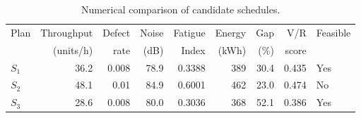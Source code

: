 \begin{table}[htbp]
\centering
\caption{Numerical comparison of candidate schedules.}
\label{tab:numerical-sim}
\small
\begin{tabular}{@{}lrrrrrrrl@{}}
\toprule
Plan & Throughput & Defect & Noise & Fatigue & Energy & Gap & V/R & Feasible \\
     & (units/h)  & rate   & (dB)  & Index   & (kWh)  & (\%) & score &         \\
\midrule
$S_{1}$ & 36.2 & 0.008 & 78.9 & 0.3388 & 389 & 30.4 & 0.435 & Yes \\
$S_{2}$ & 48.1 & 0.01 & 84.9 & 0.6001 & 462 & 23.0 & 0.474 & No \\
$S_{3}$ & 28.6 & 0.008 & 80.0 & 0.3036 & 368 & 52.1 & 0.386 & Yes \\
\bottomrule
\end{tabular}
\end{table}
